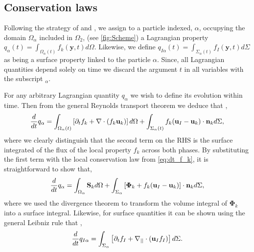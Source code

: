 \subsection{Conservation laws}

Following the strategy of \citet{paisant2014modelisation,zaepffel2012multisize,zaepffel2011modelisation,lhuillier2010multiphase} and \citet[Chapter 4]{morel2015mathematical}, 
we assign to a particle indexed, $\alpha$, occupying the domain $\Omega_\alpha$ included in $\Omega_2$, (see \ref{fig:Scheme}) a Lagrangian property $q_\alpha(t)
= \int_{\Omega_\alpha(t)} f_k(\textbf{y},t) d\Omega$.
Likewise, we define $q_{I\alpha}(t) = \int_{\Sigma_\alpha(t)} f_I(\textbf{y},t) d\Sigma$ as being a surface property linked to the particle $\alpha$.
Since, all Lagrangian quantities depend solely on time we discard the argument $t$ in all variables with the subscript $_\alpha$.

For any arbitrary Lagrangian quantity $q_\alpha$ we wish to define its evolution within time.
Then from the general Reynolds transport theorem we deduce that \citep{morel2015mathematical},
\begin{equation}
    \frac{d}{d t}  q_\alpha
    = \int_{\Omega_\alpha(t)}\left[ \partial_t f_k + \mathbf{\nabla} \cdot\left(f_k\textbf{u}_k\right) \right]d\Omega\\
    + \int_{\Sigma_\alpha(t)} f_k (\textbf{u}_I-\textbf{u}_k)\cdot \textbf{n}_k d\Sigma,
\end{equation}
where we clearly distinguish  that the second term on the RHS is the surface integrated of the flux of the local property $f_k$ across both phases.
By substituting the first term with the local conservation law from \ref{eq:dt_f_k}, it is straightforward to show that,
\begin{equation}
    \frac{d}{d t}  q_\alpha
    = \int_{\Omega_\alpha} \textbf{S}_k d\Omega
    + \int_{\Sigma_\alpha} \left[\mathbf{\Phi}_k + f_k (\textbf{u}_I-\textbf{u}_k) \right] \cdot \textbf{n}_k d\Sigma,
    \label{eq:dt_q_alpha}
\end{equation}
where we used the divergence theorem to transform the volume integral of $\mathbf{\Phi}_k$ into a surface integral. 
Likewise, for surface quantities it can be shown using the general Leibniz rule that \citep{bothe2022sharp,morel2015mathematical,stone1990simple}, 
\begin{equation}
    \frac{d}{d t}  q_{I\alpha}
    = \int_{\Sigma_\alpha} \left[
        \partial_t f_I
        +   \mathbf{\nabla}_{||} \cdot (\textbf{u}_If_I)
    \right]d\Sigma.
    \label{eq:surface_derivative}
\end{equation}

